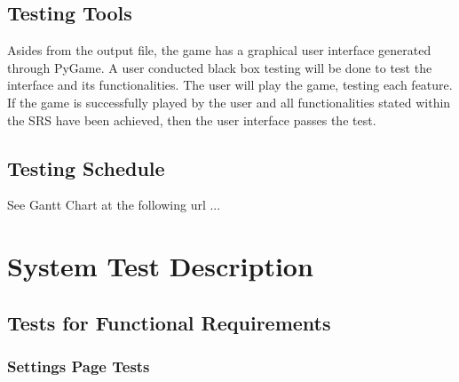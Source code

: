 \documentclass[12pt, titlepage]{article}
\begin{document}
\subsection{Testing Tools}

Asides from the output file, the game has a graphical user interface generated through PyGame. A user conducted black box testing will be done to test the interface and its functionalities. The user will play the game, testing each feature. If the game is successfully played by the user and all functionalities stated within the SRS have been achieved, then the user interface passes the test.


\subsection{Testing Schedule}
		
See Gantt Chart at the following url ...

\section{System Test Description}
	
\subsection{Tests for Functional Requirements}
\subsubsection{Settings Page Tests}
\end{document}
